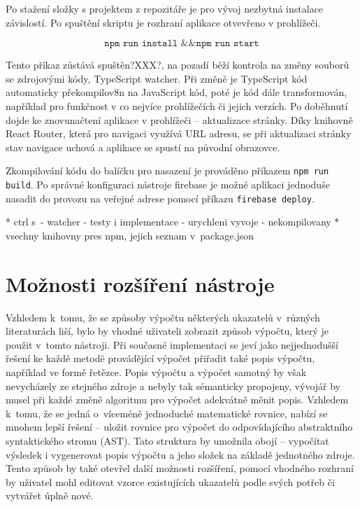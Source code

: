Po stažení složky s projektem z repozitáře je pro vývoj nezbytná instalace závislostí.
Po spuštění skriptu je rozhraní aplikace otvevřeno v prohlížeči.

$$\texttt{npm run install \&\& npm run start}$$

Tento příkaz zůstává spuštěn?XXX?, na pozadí běží kontrola na změny souborů se zdrojovými kódy, TypeScript watcher. Při změně je TypeScript kód automaticky překompilov8n na JavaScript kód, poté je kód dále transformován, například pro funkčnost v co nejvíce prohlížečích či jejich verzích. Po doběhnutí dojde ke znovunačtení aplikace v prohlížeči -- aktualizace stránky. Díky knihovně React Router, která pro navigaci využívá URL adresu, se při aktualizaci stránky stav navigace uchová a aplikace se spustí na původní obrazovce.

Zkompilování kódu do balíčku pro nasazení je prováděno příkazem \texttt{npm run build}. Po správné konfiguraci nástroje firebase je možné aplikaci jednoduše nasadit do provozu na veřejné adrese pomocí příkazu \texttt{firebase deploy}.



* ctrl s~- watcher - testy i implementace - urychleni vyvoje - nekompilovany
* vsechny knihovny pres npm, jejich seznam v~package.json


\section{Možnosti rozšíření nástroje}

Vzhledem k~tomu, že se způsoby výpočtu některých ukazatelů v~různých literaturách liší, bylo by vhodné uživateli zobrazit způsob výpočtu, který je použit v~tomto nástroji. Při současné implementaci se jeví jako nejjednodušší řešení ke každé metodě provádějící výpočet přiřadit také popis výpočtu, například ve formě řetězce. Popis výpočtu a výpočet samotný by však nevycházely ze stejného zdroje a nebyly tak sémanticky propojeny, vývojář by musel při každé změně algoritmu pro výpočet adekvátně měnit popis. Vzhledem k~tomu, že se jedná o~víceméně jednoduché matematické rovnice, nabízí se mnohem lepší řešení -- uložit rovnice pro výpočet do odpovídajícího abstraktního syntaktického stromu (AST). Tato struktura by umožnila obojí -- vypočítat výsledek i vygenerovat popis výpočtu a jeho složek na základě jednotného zdroje. Tento způsob by také otevřel další možnosti rozšíření, pomocí vhodného rozhraní by uživatel mohl editovat vzorce existujících ukazatelů podle svých potřeb či vytvářet úplně nové.

